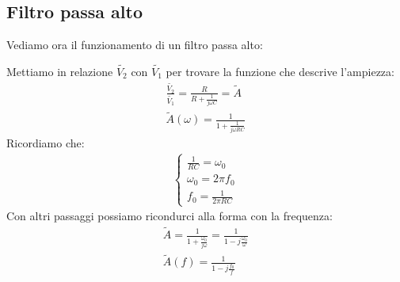 \documentclass[a4paper, oneside]{article}
\begin{document}
\subsection*{Filtro passa alto}
Vediamo ora il funzionamento di un filtro passa alto:
\begin{center}
\end{center}
Mettiamo in relazione $\widetilde{V_2}$ con $\widetilde{V_1}$ per trovare la funzione che descrive l'ampiezza: 
\begin{gather*}
    \frac{\widetilde{V_2}}{\widetilde{V_1}} = \frac{R}{R + \frac{1}{j \omega C}} = \widetilde{A}\\
    \widetilde{A} (\omega) = \frac{1}{1 + \frac{1}{j \omega RC}}
\end{gather*}
Ricordiamo che:
\begin{gather*}
    \begin{cases}
        \frac{1}{RC} = \omega_0\\
        \omega_0 = 2 \pi f_0\\
        f_0 = \frac{1}{2 \pi RC}
    \end{cases}
\end{gather*}
Con altri passaggi possiamo ricondurci alla forma con la frequenza:
\begin{gather*}
    \widetilde{A} = \frac{1}{1 + \frac{\omega_0}{j \omega}} = \frac{1}{1 - j \frac{\omega_0}{\omega}}\\
    \widetilde{A}(f) = \frac{1}{1 - j \frac{f_0}{f}}
\end{gather*}
\end{document}
